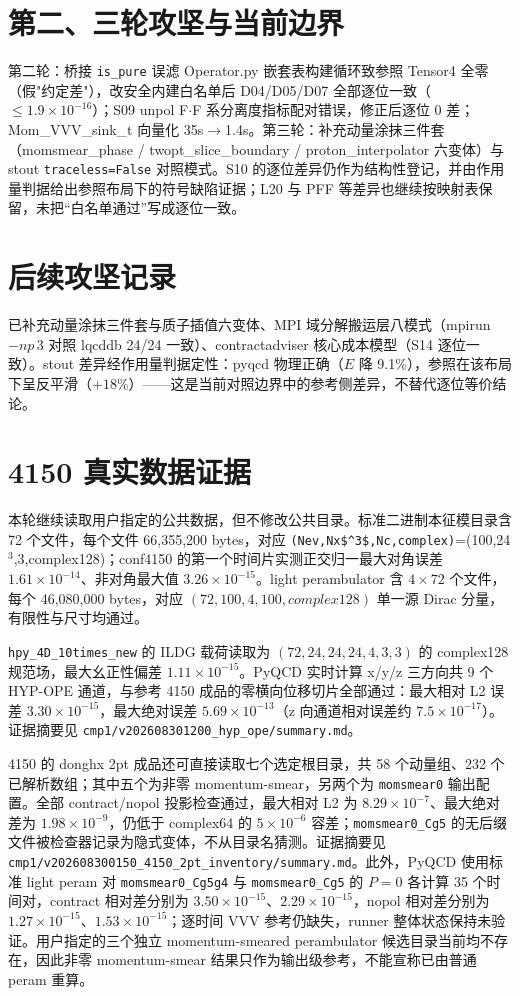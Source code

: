 \documentclass[10.5pt]{ctexart}
\begin{document}
\section{第二、三轮攻坚与当前边界}
第二轮：桥接 \verb|is_pure| 误滤 Operator.py 嵌套表构建循环致参照 Tensor4 全零（假"约定差"），改安全内建白名单后 D04/D05/D07 全部逐位一致（$\leq 1.9\times10^{-16}$）；S09 unpol F$\cdot$F 系分离度指标配对错误，修正后逐位 0 差；Mom\_VVV\_sink\_t 向量化 35s$\to$1.4s。第三轮：补充动量涂抹三件套（momsmear\_phase / twopt\_slice\_boundary / proton\_interpolator 六变体）与 stout \verb|traceless=False| 对照模式。S10 的逐位差异仍作为结构性登记，并由作用量判据给出参照布局下的符号缺陷证据；L20 与 PFF 等差异也继续按映射表保留，未把“白名单通过”写成逐位一致。

\section{后续攻坚记录}
已补充动量涂抹三件套与质子插值六变体、MPI 域分解搬运层八模式（mpirun $-np\,3$ 对照 lqcddb 24/24 一致）、contractadviser 核心成本模型（S14 逐位一致）。stout 差异经作用量判据定性：pyqcd 物理正确（$E$ 降 9.1\%），参照在该布局下呈反平滑（$+18\%$）——这是当前对照边界中的参考侧差异，不替代逐位等价结论。

\section{4150 真实数据证据}
本轮继续读取用户指定的公共数据，但不修改公共目录。标准二进制本征模目录含 72 个文件，每个文件 66,355,200 bytes，对应 \verb|(Nev,Nx$^3$,Nc,complex)|=(100,24$^3$,3,complex128)；conf4150 的第一个时间片实测正交归一最大对角误差 $1.61\times10^{-14}$、非对角最大值 $3.26\times10^{-15}$。light perambulator 含 $4\times72$ 个文件，每个 46,080,000 bytes，对应 $(72,100,4,100,complex128)$ 单一源 Dirac 分量，有限性与尺寸均通过。

\verb|hpy_4D_10times_new| 的 ILDG 载荷读取为 $(72,24,24,24,4,3,3)$ 的 complex128 规范场，最大幺正性偏差 $1.11\times10^{-15}$。PyQCD 实时计算 x/y/z 三方向共 9 个 HYP-OPE 通道，与参考 4150 成品的零横向位移切片全部通过：最大相对 L2 误差 $3.30\times10^{-15}$，最大绝对误差 $5.69\times10^{-13}$（z 向通道相对误差约 $7.5\times10^{-17}$）。证据摘要见 \verb|cmp1/v202608301200_hyp_ope/summary.md|。

4150 的 donghx 2pt 成品还可直接读取七个选定根目录，共 58 个动量组、232 个已解析数组；其中五个为非零 momentum-smear，另两个为 \verb|momsmear0| 输出配置。全部 contract/nopol 投影检查通过，最大相对 L2 为 $8.29\times10^{-7}$、最大绝对差为 $1.98\times10^{-9}$，仍低于 complex64 的 $5\times10^{-6}$ 容差；\verb|momsmear0_Cg5| 的无后缀文件被检查器记录为隐式变体，不从目录名猜测。证据摘要见 \verb|cmp1/v202608300150_4150_2pt_inventory/summary.md|。此外，PyQCD 使用标准 light peram 对 \verb|momsmear0_Cg5g4| 与 \verb|momsmear0_Cg5| 的 $P=0$ 各计算 35 个时间对，contract 相对差分别为 $3.50\times10^{-15}$、$2.29\times10^{-15}$，nopol 相对差分别为 $1.27\times10^{-15}$、$1.53\times10^{-15}$；逐时间 VVV 参考仍缺失，runner 整体状态保持未验证。用户指定的三个独立 momentum-smeared perambulator 候选目录当前均不存在，因此非零 momentum-smear 结果只作为输出级参考，不能宣称已由普通 peram 重算。
\end{document}
